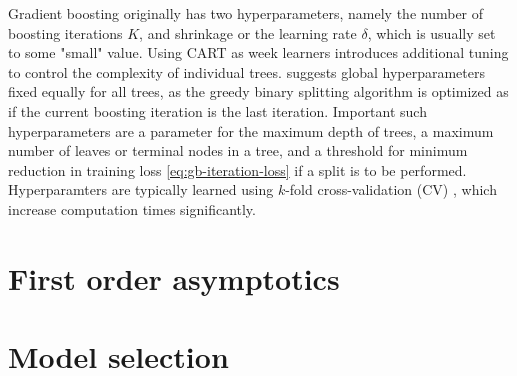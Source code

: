 Gradient boosting originally has two hyperparameters, namely the number of boosting iterations $K$, and shrinkage or the learning rate $\delta$, which is usually set to some "small" value.
Using CART as week learners introduces additional tuning to control the complexity of individual trees.
\citet{friedman2000additive} suggests global hyperparameters fixed equally for all trees, as the greedy binary splitting algorithm is optimized as if the current boosting iteration is the last iteration.
Important such hyperparameters are a parameter for the maximum depth of trees, a maximum number of leaves or terminal nodes in a tree, and a threshold for minimum reduction in training loss \eqref{eq:gb-iteration-loss} if a split is to be performed.
Hyperparamters are typically learned using $k$-fold cross-validation (CV) \citep{stone1974cross}, which increase computation times significantly.





%
%
%
%
%
%
%
%
%
%
%
%


\section{First order asymptotics}
\label{sec:first order asymptotics}


\section{Model selection}
\label{sec:model selection}

